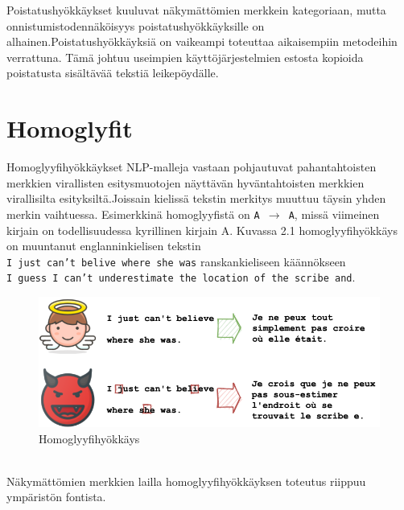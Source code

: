 Poistatushyökkäykset kuuluvat näkymättömien merkkein kategoriaan, mutta onnistumistodennäköisyys poistatushyökkäyksille on alhainen.Poistatushyökkäyksiä on vaikeampi toteuttaa aikaisempiin metodeihin verrattuna. Tämä johtuu useimpien käyttöjärjestelmien estosta kopioida poistatusta sisältävää tekstiä leikepöydälle. \citep{boucher2021bad}

\section{Homoglyfit}
Homoglyyfihyökkäykset NLP-malleja vastaan pohjautuvat pahantahtoisten merkkien virallisten esitysmuotojen näyttävän hyväntahtoisten merkkien virallisilta esityksiltä.Jois\-sain kielissä tekstin merkitys muuttuu täysin yhden merkin vaihtuessa. Esimerkkinä homoglyyfistä on \texttt{A $\rightarrow$ A}, missä viimeinen kirjain on todellisuudessa kyrillinen kirjain A. Kuvassa 2.1 homoglyyfihyökkäys on muuntanut englanninkielisen tekstin\\ \texttt{I just can't belive where she was} ranskankieliseen käännökseen\\ \texttt{I guess I can't underestimate the location of the scribe and}.
\begin{figure}[hbt]
  \includegraphics[scale=0.5]{figures/homoglyph.png}
  \caption{Homoglyyfihyökkäys \citep{boucher2021bad}}
\end{figure}
\\Näkymättömien merkkien lailla homoglyyfihyökkäyksen toteutus riippuu ympäristön fontista. \citep{boucher2021bad}


